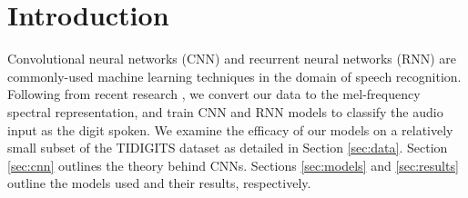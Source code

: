 \section{Introduction}
\label{Introduction}
Convolutional neural networks (CNN) and recurrent neural networks (RNN) are commonly-used machine learning techniques in the domain of speech recognition. Following from recent research \cite{abdel2014convolutional}, we convert our data to the mel-frequency spectral representation, and train CNN and RNN models to classify the audio input as the digit spoken. We examine the efficacy of our models on a relatively small subset of the TIDIGITS dataset as detailed in Section \ref{sec:data}. Section \ref{sec:cnn} outlines the theory behind CNNs. Sections \ref{sec:models} and \ref{sec:results} outline the models used and their results, respectively.
